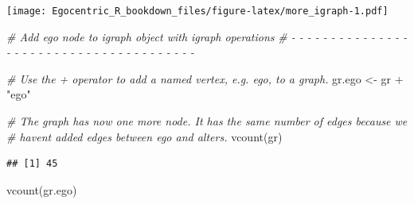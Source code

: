 \documentclass[
]{book}
\newenvironment{Shaded}{\begin{snugshade}}{\end{snugshade}}
\newcommand{\AttributeTok}[1]{\textcolor[rgb]{0.77,0.63,0.00}{#1}}
\newcommand{\CommentTok}[1]{\textcolor[rgb]{0.56,0.35,0.01}{\textit{#1}}}
\newcommand{\ConstantTok}[1]{\textcolor[rgb]{0.00,0.00,0.00}{#1}}
\newcommand{\DecValTok}[1]{\textcolor[rgb]{0.00,0.00,0.81}{#1}}
\newcommand{\FunctionTok}[1]{\textcolor[rgb]{0.00,0.00,0.00}{#1}}
\newcommand{\NormalTok}[1]{#1}
\newcommand{\OtherTok}[1]{\textcolor[rgb]{0.56,0.35,0.01}{#1}}
\newcommand{\SpecialCharTok}[1]{\textcolor[rgb]{0.00,0.00,0.00}{#1}}
\newcommand{\StringTok}[1]{\textcolor[rgb]{0.31,0.60,0.02}{#1}}
\begin{document}
\begin{Shaded}
\end{Shaded}

\texttt{[image: Egocentric\_R\_bookdown\_files/figure-latex/more\_igraph-1.pdf]}

\begin{Shaded}
\begin{Highlighting}[]
\CommentTok{\# Add ego node to igraph object with igraph operations}
\CommentTok{\# {-} {-} {-} {-} {-} {-} {-} {-} {-} {-} {-} {-} {-} {-} {-} {-} {-} {-} {-} {-} {-} {-} {-} {-} {-} {-} {-} {-} {-} {-} {-} {-} {-} {-} {-} {-} {-} {-} {-} }

\CommentTok{\# Use the + operator to add a named vertex, e.g. ego, to a graph.}
\NormalTok{gr.ego }\OtherTok{\textless{}{-}}\NormalTok{ gr }\SpecialCharTok{+} \StringTok{"ego"}

\CommentTok{\# The graph has now one more node. It has the same number of edges because we}
\CommentTok{\# haven\textquotesingle{}t added edges between ego and alters.}
\FunctionTok{vcount}\NormalTok{(gr)}
\end{Highlighting}
\end{Shaded}

\begin{verbatim}
## [1] 45
\end{verbatim}

\begin{Shaded}
\begin{Highlighting}[]
\FunctionTok{vcount}\NormalTok{(gr.ego)}
\end{Highlighting}
\end{Shaded}
\end{document}
